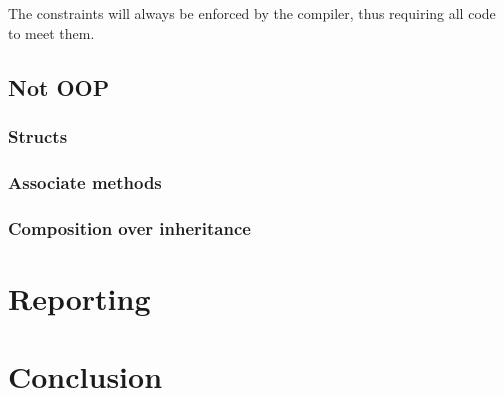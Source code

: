 \documentclass[a4paper,10pt]{article}
\begin{document}
The constraints will always be enforced by the compiler, thus requiring all code to meet them.

\subsection{Not OOP}
\subsubsection{Structs}
\subsubsection{Associate methods}
\subsubsection{Composition over inheritance}





\section{Reporting}

\section{Conclusion}




\end{document}
